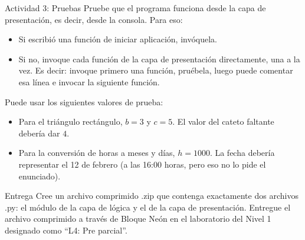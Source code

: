 \documentclass{ip-lab}
\begin{document}
\pagebreak

\begin{sectionbox}{Actividad 3: Pruebas}
Pruebe que el programa funciona desde la capa de presentación, es decir, desde la consola. Para eso:
\begin{itemize}
    \item Si escribió una función de iniciar aplicación, invóquela.
    \item Si no, invoque cada función de la capa de presentación directamente, una a la vez. Es decir: invoque primero una función, pruébela, luego puede comentar esa línea e invocar la siguiente función.
\end{itemize}

Puede usar los siguientes valores de prueba:
\begin{itemize}
  \item Para el triángulo rectángulo, $b = 3$ y $c = 5$. El valor del cateto faltante debería dar $4$.
  \item Para la conversión de horas a meses y días, $h = 1000$. La fecha debería representar el 12 de febrero (a las 16:00 horas, pero eso no lo pide el enunciado).
\end{itemize}

\end{sectionbox}

\begin{sectionbox}{Entrega}
  Cree un archivo comprimido .zip que contenga exactamente dos archivos .py: el módulo de la capa de lógica y el de la capa de presentación. Entregue el archivo comprimido a través de Bloque Neón en el laboratorio del Nivel 1 designado como ``L4: Pre parcial''.
\end{sectionbox}
\end{document}
